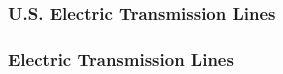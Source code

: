 \documentclass[14pt, unknownkeysallowed]{beamer}
\begin{document}
\begin{frame}
\frametitle{U.S. Electric Transmission Lines}
\end{frame}
\begin{frame}
\frametitle{Electric Transmission Lines}
\end{frame}
\end{document}

